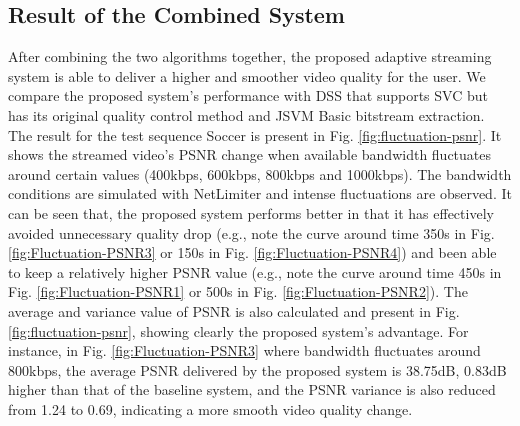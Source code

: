 \documentclass[journal]{IEEEtran}
\begin{document}
\subsection{Result of the Combined System}

After combining the two algorithms together, the proposed adaptive streaming system is able to deliver a higher and smoother video quality for the user. We compare the proposed system's performance with DSS that supports SVC but has its original quality control method and JSVM Basic bitstream extraction. The result for the test sequence Soccer is present in Fig. \ref{fig:fluctuation-psnr}. It shows the streamed video's PSNR change when available bandwidth fluctuates around certain values (400kbps, 600kbps, 800kbps and 1000kbps). The bandwidth conditions are simulated with NetLimiter and intense fluctuations are observed. It can be seen that, the proposed system performs better in that it has effectively avoided unnecessary quality drop (e.g., note the curve around time 350s in Fig. \ref{fig:Fluctuation-PSNR3} or 150s in Fig. \ref{fig:Fluctuation-PSNR4}) and been able to keep a relatively higher PSNR value (e.g., note the curve around time 450s in Fig. \ref{fig:Fluctuation-PSNR1} or 500s in Fig. \ref{fig:Fluctuation-PSNR2}). The average and variance value of PSNR is also calculated and present in Fig. \ref{fig:fluctuation-psnr}, showing clearly the proposed system's advantage. For instance, in Fig. \ref{fig:Fluctuation-PSNR3} where bandwidth fluctuates around 800kbps, the average PSNR delivered by the proposed system is 38.75dB, 0.83dB higher than that of the baseline system, and the PSNR variance is also reduced from 1.24 to 0.69, indicating a more smooth video quality change.
\end{document}
